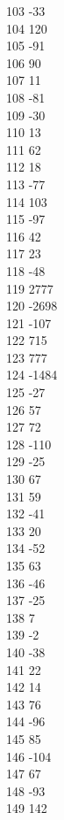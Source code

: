 { 103	-33 \\
 104	120 \\
 105	-91 \\
 106	90 \\
 107	11 \\
 108	-81 \\
 109	-30 \\
 110	13 \\
 111	62 \\
 112	18 \\
 113	-77 \\
 114	103 \\
 115	-97 \\
 116	42 \\
 117	23 \\
 118	-48 \\
 119	2777 \\
 120	-2698 \\
 121	-107 \\
 122	715 \\
 123	777 \\
 124	-1484 \\
 125	-27 \\
 126	57 \\
 127	72 \\
 128	-110 \\
 129	-25 \\
 130	67 \\
 131	59 \\
 132	-41 \\
 133	20 \\
 134	-52 \\
 135	63 \\
 136	-46 \\
 137	-25 \\
 138	7 \\
 139	-2 \\
 140	-38 \\
 141	22 \\
 142	14 \\
 143	76 \\
 144	-96 \\
 145	85 \\
 146	-104 \\
 147	67 \\
 148	-93 \\
 149	142 \\
}
